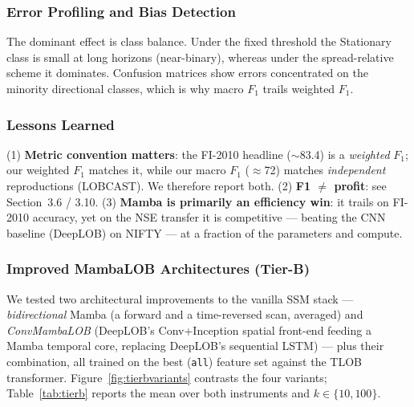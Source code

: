 \documentclass[11pt]{article}
\begin{document}
\subsubsection{Error Profiling and Bias Detection}
The dominant effect is class balance. Under the fixed threshold the Stationary class is small at long
horizons (near-binary), whereas under the spread-relative scheme it dominates. Confusion matrices show
errors concentrated on the minority directional classes, which is why macro $F_1$ trails weighted $F_1$.

\subsubsection{Lessons Learned}
(1) \textbf{Metric convention matters}: the FI-2010 headline ($\sim$83.4) is a \emph{weighted} $F_1$; our
weighted $F_1$ matches it, while our macro $F_1$ ($\approx$72) matches \emph{independent} reproductions
(LOBCAST). We therefore report both. (2) \textbf{F1 $\ne$ profit}: see Section~3.6 / 3.10. (3)
\textbf{Mamba is primarily an efficiency win}: it trails on FI-2010 accuracy, yet on the NSE transfer it is
competitive --- beating the CNN baseline (DeepLOB) on NIFTY --- at a fraction of the parameters and compute.

\subsubsection{Improved MambaLOB Architectures (Tier-B)}
We tested two architectural improvements to the vanilla SSM stack --- \emph{bidirectional} Mamba (a forward
and a time-reversed scan, averaged) and \emph{ConvMambaLOB} (DeepLOB's Conv+Inception spatial front-end
feeding a Mamba temporal core, replacing DeepLOB's sequential LSTM) --- plus their combination, all trained
on the best (\texttt{all}) feature set against the TLOB transformer. Figure~\ref{fig:tierbvariants} contrasts
the four variants; Table~\ref{tab:tierb} reports the mean over both instruments and $k\in\{10,100\}$.
\end{document}
